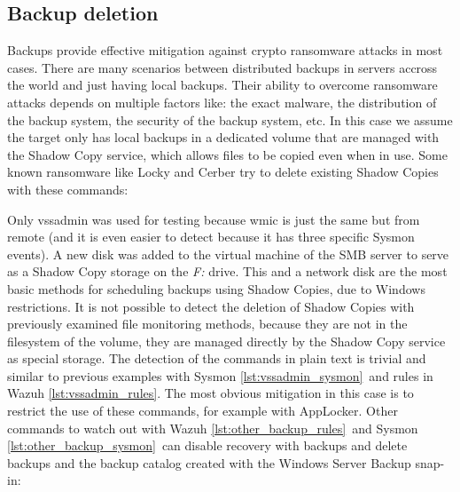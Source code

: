 \subsection{Backup deletion}
Backups provide effective mitigation against crypto ransomware attacks in most cases.
There are many scenarios between distributed backups in servers accross the world and just having local backups.
Their ability to overcome ransomware attacks depends on multiple factors like: the exact malware, the distribution of the backup system, the security of the backup system, etc.
\linej
In this case we assume the target only has local backups in a dedicated volume that are managed with the Shadow Copy service, which allows files to be copied even when in use.
Some known ransomware like Locky and Cerber try to delete existing Shadow Copies with these commands\cite{ransomware_oReilly}:

\linej
Only vssadmin was used for testing because wmic is just the same but from remote (and it is even easier to detect because it has three specific Sysmon events).
A new disk was added to the virtual machine of the SMB server to serve as a Shadow Copy storage on the \textit{F:} drive.
This and a network disk are the most basic methods for scheduling backups using Shadow Copies, due to Windows restrictions.
\linej
\linej
It is not possible to detect the deletion of Shadow Copies with previously examined file monitoring methods, because they are not in the filesystem of the volume, they are managed directly by the Shadow Copy service as special storage.
\linej
The detection of the commands in plain text is trivial and similar to previous examples with Sysmon \ref{lst:vssadmin_sysmon}\ and rules in Wazuh \ref{lst:vssadmin_rules}.
\linej
The most obvious mitigation in this case is to restrict the use of these commands, for example with AppLocker.
\linej
\linej
Other commands to watch out with Wazuh \ref{lst:other_backup_rules}\ and Sysmon \ref{lst:other_backup_sysmon}\ can disable recovery with backups and delete backups and the backup catalog created with the Windows Server Backup snap-in\cite{wannacry_IOCS_details}\cite{wbadmin}:


